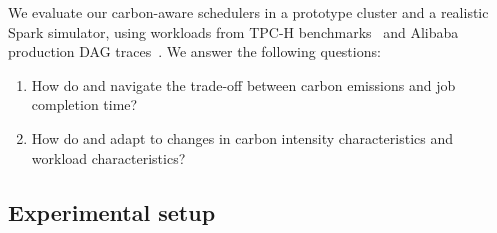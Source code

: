 \noindent We evaluate our carbon-aware schedulers in a prototype cluster and a realistic Spark simulator, using workloads from TPC-H benchmarks~\cite{TPCH:18} and Alibaba production DAG traces~\cite{Alibaba:18}.  We answer the following questions:
\begin{enumerate}[leftmargin=*]
    \item How do \DANISH and \CAP navigate the trade-off between carbon emissions and job completion time?
    \item How do \DANISH and \CAP adapt to changes in carbon intensity characteristics and workload characteristics?
\end{enumerate}
\vspace{-0.5em}


\subsection{Experimental setup} 
\label{sec:carbon-traces}


